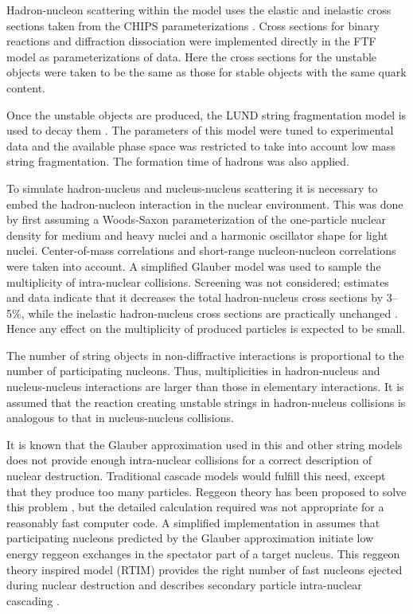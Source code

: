 
Hadron-nucleon scattering within the model uses the elastic and inelastic cross 
sections taken from the CHIPS parameterizations \cite{hadbib:CHIPS}. 
Cross sections for binary reactions and diffraction dissociation were implemented
directly in the FTF model as parameterizations of data.  Here the cross sections
for the unstable objects were taken to be the same as those for stable objects
with the same quark content.  

Once the unstable objects are produced, the LUND string fragmentation model is 
used to decay them \cite{hadbib:FTF7}.  The parameters of this model were tuned
to experimental data and the available phase space was restricted to take into 
account low mass string fragmentation.  The formation time of hadrons was also 
applied.

To simulate hadron-nucleus and nucleus-nucleus scattering it is necessary to 
embed the hadron-nucleon interaction in the nuclear environment.  This was done
by first assuming a Woods-Saxon parameterization of the one-particle nuclear 
density for medium and heavy nuclei and a harmonic oscillator shape for light 
nuclei.  Center-of-mass correlations and short-range nucleon-nucleon 
correlations were taken into account.  A simplified Glauber model was used to 
sample the multiplicity of intra-nuclear collisions.  Screening was not 
considered; estimates and data indicate that it decreases the total 
hadron-nucleus cross sections by 3--5\%, while the inelastic hadron-nucleus 
cross sections are practically unchanged \cite{hadbib:Alvi}.  Hence any effect 
on the multiplicity of produced particles is expected to be small.

The number of string objects in non-diffractive interactions is proportional to
the number of participating nucleons. Thus, multiplicities in hadron-nucleus and
nucleus-nucleus interactions are larger than those in elementary interactions.
It is assumed that the reaction creating unstable strings in hadron-nucleus
collisions is analogous to that in nucleus-nucleus collisions.

It is known that the Glauber approximation used in this and other string models
does not provide enough intra-nuclear collisions for a correct description of
nuclear destruction.  Traditional cascade models would fulfill this need, except 
that they produce too many particles.  Reggeon theory has been proposed to solve
this problem \cite{hadbib:FTF18}, but the detailed calculation required was not
appropriate for a reasonably fast computer code.  A simplified implementation in
\Gfour{} assumes \cite{hadbib:FTF10} that participating nucleons predicted by the 
Glauber approximation initiate low energy reggeon exchanges in the spectator 
part of a target nucleus.  This reggeon theory inspired model (RTIM) provides 
the right number of fast nucleons ejected during nuclear destruction and 
describes secondary particle intra-nuclear cascading \cite{hadbib:FTF8}.   

